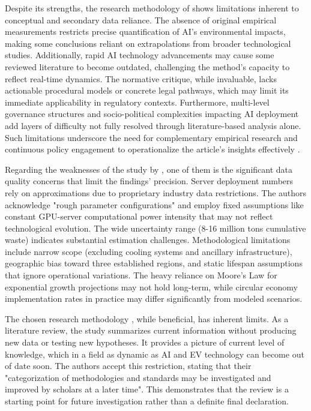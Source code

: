 \documentclass[a4paper, 12pt]{article}
\begin{document}
\par Despite its strengths, the research methodology of \citet{Zhuk2023} shows limitations inherent to conceptual and secondary data reliance. The absence of original empirical measurements restricts precise quantification of AI’s environmental impacts, making some conclusions reliant on extrapolations from broader technological studies. Additionally, rapid AI technology advancements may cause some reviewed literature to become outdated, challenging the method’s capacity to reflect real-time dynamics. The normative critique, while invaluable, lacks actionable procedural models or concrete legal pathways, which may limit its immediate applicability in regulatory contexts. Furthermore, multi-level governance structures and socio-political complexities impacting AI deployment add layers of difficulty not fully resolved through literature-based analysis alone. Such limitations underscore the need for complementary empirical research and continuous policy engagement to operationalize the article’s insights effectively \citep[pp.~964--967]{Zhuk2023}.\hfill \break
\par Regarding the weaknesses of the study by \cite{wang_2024_ewaste}, one of them is the significant data quality concerns that limit the findings' precision. Server deployment numbers rely on approximations due to proprietary industry data restrictions. The authors acknowledge "rough parameter configurations" and employ fixed assumptions like constant GPU-server computational power intensity that may not reflect technological evolution. The wide uncertainty range (8-16 million tons cumulative waste) indicates substantial estimation challenges. Methodological limitations include narrow scope (excluding cooling systems and ancillary infrastructure), geographic bias toward three established regions, and static lifespan assumptions that ignore operational variations. The heavy reliance on Moore's Law for exponential growth projections may not hold long-term, while circular economy implementation rates in practice may differ significantly from modeled scenarios. \hfill \break
\par The chosen research methodology \citet{M.rauf2024}, while beneficial, has inherent limits.  As a literature review, the study summarizes current information without producing new data or testing new hypotheses.  It provides a picture of current level of knowledge, which in a field as dynamic as AI and EV technology can become out of date soon.  The authors accept this restriction, stating that their "categorization of methodologies and standards may be investigated and improved by scholars at a later time".  This demonstrates that the review is a starting point for future investigation rather than a definite final declaration. \hfill \break
\end{document}

